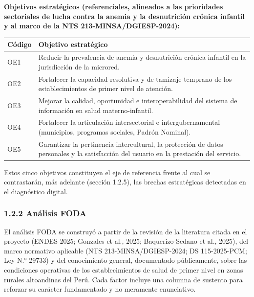 \documentclass[11pt,a4paper]{article}
\begin{document}
\textbf{Objetivos estratégicos (referenciales, alineados a las prioridades sectoriales de lucha contra la anemia y la desnutrición crónica infantil y al marco de la NTS 213-MINSA/DGIESP-2024):}

{\small
\begin{longtable}[]{@{}
  >{\raggedright\arraybackslash}p{}
  >{\raggedright\arraybackslash}p{}@{}}
\toprule\noalign{}
\begin{minipage}[b]{\linewidth}\raggedright
Código
\end{minipage} & \begin{minipage}[b]{\linewidth}\raggedright
Objetivo estratégico
\end{minipage} \\
\midrule\noalign{}
\endhead
\bottomrule\noalign{}
\endlastfoot
OE1 & Reducir la prevalencia de anemia y desnutrición crónica infantil en la jurisdicción de la microred. \\
OE2 & Fortalecer la capacidad resolutiva y de tamizaje temprano de los establecimientos de primer nivel de atención. \\
OE3 & Mejorar la calidad, oportunidad e interoperabilidad del sistema de información en salud materno-infantil. \\
OE4 & Fortalecer la articulación intersectorial e intergubernamental (municipios, programas sociales, Padrón Nominal). \\
OE5 & Garantizar la pertinencia intercultural, la protección de datos personales y la satisfacción del usuario en la prestación del servicio. \\
\end{longtable}
}

Estos cinco objetivos constituyen el eje de referencia frente al cual se contrastarán, más adelante (sección 1.2.5), las brechas estratégicas detectadas en el diagnóstico digital.

\subsubsection{1.2.2 Análisis FODA}\label{anuxe1lisis-foda}

El análisis FODA se construyó a partir de la revisión de la literatura citada en el proyecto (ENDES 2025; Gonzales et al., 2025; Baquerizo-Sedano et al., 2025), del marco normativo aplicable (NTS 213-MINSA/DGIESP-2024; DS 115-2025-PCM; Ley N.° 29733) y del conocimiento general, documentado públicamente, sobre las condiciones operativas de los establecimientos de salud de primer nivel en zonas rurales altoandinas del Perú. Cada factor incluye una columna de sustento para reforzar su carácter fundamentado y no meramente enunciativo.
\end{document}
